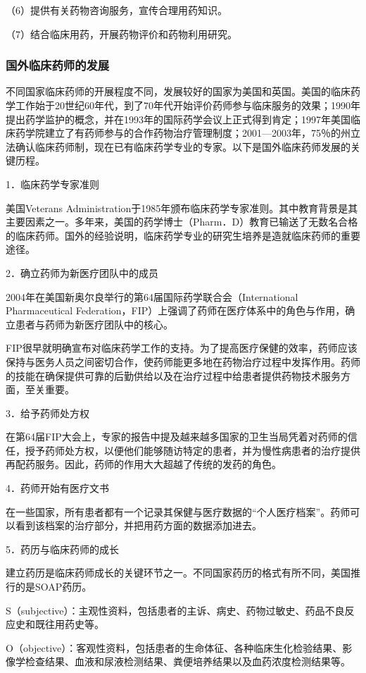 （6）提供有关药物咨询服务，宣传合理用药知识。

（7）结合临床用药，开展药物评价和药物利用研究。

\subsubsection{国外临床药师的发展}

不同国家临床药师的开展程度不同，发展较好的国家为美国和英国。美国的临床药学工作始于20世纪60年代，到了70年代开始评价药师参与临床服务的效果；1990年提出药学监护的概念，并在1993年的国际药学会议上正式得到肯定；1997年美国临床药学院建立了有药师参与的合作药物治疗管理制度；2001---2003年，75％的州立法确认临床药师制，现在已有临床药学专业的专家。以下是国外临床药师发展的关键历程。

1．临床药学专家准则

美国Veterans
Administration于1985年颁布临床药学专家准则。其中教育背景是其主要因素之一。多年来，美国的药学博士（Pharm．D）教育已输送了无数名合格的临床药师。国外的经验说明，临床药学专业的研究生培养是造就临床药师的重要途径。

2．确立药师为新医疗团队中的成员

2004年在美国新奥尔良举行的第64届国际药学联合会（International
Pharmaceutical
Federation，FIP）上强调了药师在医疗体系中的角色与作用，确立患者与药师为新医疗团队中的核心。

FIP很早就明确宣布对临床药学工作的支持。为了提高医疗保健的效率，药师应该保持与医务人员之间密切合作，使药师能更多地在药物治疗过程中发挥作用。药师的技能在确保提供可靠的后勤供给以及在治疗过程中给患者提供药物技术服务方面，至关重要。

3．给予药师处方权

在第64届FIP大会上，专家的报告中提及越来越多国家的卫生当局凭着对药师的信任，授予药师处方权，以便他们能够随访特定的患者，并为慢性病患者的治疗提供再配药服务。因此，药师的作用大大超越了传统的发药的角色。

4．药师开始有医疗文书

在一些国家，所有患者都有一个记录其保健与医疗数据的“个人医疗档案”。药师可以看到该档案的治疗部分，并把用药方面的数据添加进去。

5．药历与临床药师的成长

建立药历是临床药师成长的关键环节之一。不同国家药历的格式有所不同，美国推行的是SOAP药历。

S（subjective）：主观性资料，包括患者的主诉、病史、药物过敏史、药品不良反应史和既往用药史等。

O（objective）：客观性资料，包括患者的生命体征、各种临床生化检验结果、影像学检查结果、血液和尿液检测结果、粪便培养结果以及血药浓度检测结果等。

